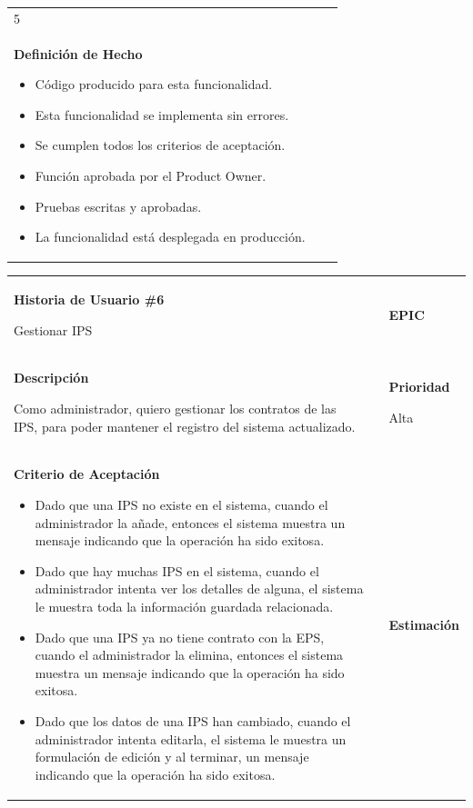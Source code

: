 \documentclass[12pt,a4paper]{article}
\begin{document}
\begin{center}
\begin{tabular}{| p{10cm} c p{2.5cm}|}
5 \\ 

\textbf{Definición de Hecho}

\begin{itemize}
\item Código producido para esta funcionalidad.
\item Esta funcionalidad se implementa sin errores.
\item Se cumplen todos los criterios de aceptación.
\item Función aprobada por el Product Owner.
\item Pruebas escritas y aprobadas.
\item La funcionalidad está desplegada en producción.
\end{itemize} & & \\
\hline  
\end{tabular}
\vspace{5mm}

\begin{tabular}{|>{\columncolor[RGB]{215, 215, 215}} p{10cm} >{\columncolor[RGB]{215, 215, 215}} c >{\columncolor[RGB]{215, 215, 215}} p{2.5cm}|}
\hline 
\textbf{Historia de Usuario \#6}

Gestionar IPS & & \textbf{{\Large EPIC}} \\ 
\textbf{Descripción}

Como administrador, quiero gestionar los contratos de las IPS, para poder
mantener el registro del sistema actualizado. &  & \textbf{Prioridad}

Alta\\

\textbf{Criterio de Aceptación}

\begin{itemize}
\item Dado que una IPS no existe en el sistema, cuando el
administrador la añade, entonces el sistema muestra un mensaje
indicando que la operación ha sido exitosa.
\item Dado que hay muchas IPS en el sistema, cuando el administrador
intenta ver los detalles de alguna, el sistema le muestra toda la
información guardada relacionada.
\item Dado que una IPS ya no tiene contrato con la EPS, cuando el
administrador la elimina, entonces el sistema muestra un
mensaje indicando que la operación ha sido exitosa.
\item Dado que los datos de una IPS han cambiado, cuando el
administrador intenta editarla, el sistema le muestra un
formulación de edición y al terminar, un mensaje indicando que
la operación ha sido exitosa.
\end{itemize} & & \textbf{Estimación}


\end{tabular}
\end{center}
\end{document}
